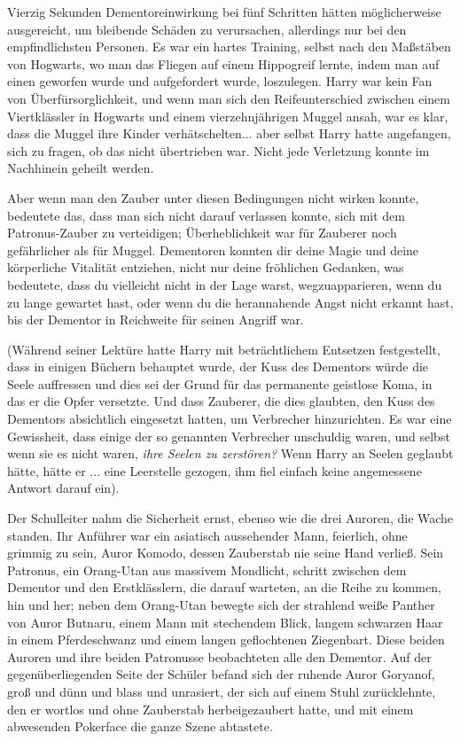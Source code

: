 Vierzig Sekunden Dementoreinwirkung bei fünf Schritten hätten möglicherweise
ausgereicht, um bleibende Schäden zu verursachen, allerdings nur bei den
empfindlichsten Personen. Es war ein hartes Training, selbst nach den Maßstäben
von Hogwarts, wo man das Fliegen auf einem Hippogreif lernte, indem man auf
einen geworfen wurde und aufgefordert wurde, loszulegen. Harry war kein Fan von
Überfürsorglichkeit, und wenn man sich den Reifeunterschied zwischen einem
Viertklässler in Hogwarts und einem vierzehnjährigen Muggel ansah, war es klar,
dass die Muggel ihre Kinder verhätschelten... aber selbst Harry hatte
angefangen, sich zu fragen, ob das nicht übertrieben war. Nicht jede Verletzung
konnte im Nachhinein geheilt werden.

Aber wenn man den Zauber unter diesen Bedingungen nicht wirken konnte, bedeutete
das, dass man sich nicht darauf verlassen konnte, sich mit dem Patronus-Zauber
zu verteidigen; Überheblichkeit war für Zauberer noch gefährlicher als für
Muggel. Dementoren konnten dir deine Magie und deine körperliche Vitalität
entziehen, nicht nur deine fröhlichen Gedanken, was bedeutete, dass du
vielleicht nicht in der Lage warst, wegzuapparieren, wenn du zu lange gewartet
hast, oder wenn du die herannahende Angst nicht erkannt hast, bis der Dementor
in Reichweite für seinen Angriff war.

(Während seiner Lektüre hatte Harry mit beträchtlichem Entsetzen festgestellt,
dass in einigen Büchern behauptet wurde, der Kuss des Dementors würde die Seele
auffressen und dies sei der Grund für das permanente geistlose Koma, in das er
die Opfer versetzte. Und dass Zauberer, die dies glaubten, den Kuss des
Dementors absichtlich eingesetzt hatten, um Verbrecher hinzurichten. Es war eine
Gewissheit, dass einige der so genannten Verbrecher unschuldig waren, und selbst
wenn sie es nicht waren,\emph{ ihre Seelen zu zerstören?} Wenn Harry an Seelen
geglaubt hätte, hätte er ... eine Leerstelle gezogen, ihm fiel einfach keine
angemessene Antwort darauf ein).

Der Schulleiter nahm die Sicherheit ernst, ebenso wie die drei Auroren, die
Wache standen. Ihr Anführer war ein asiatisch aussehender Mann, feierlich, ohne
grimmig zu sein, Auror Komodo, dessen Zauberstab nie seine Hand verließ. Sein
Patronus, ein Orang-Utan aus massivem Mondlicht, schritt zwischen dem Dementor
und den Erstklässlern, die darauf warteten, an die Reihe zu kommen, hin und her;
neben dem Orang-Utan bewegte sich der strahlend weiße Panther von Auror Butnaru,
einem Mann mit stechendem Blick, langem schwarzen Haar in einem Pferdeschwanz
und einem langen geflochtenen Ziegenbart. Diese beiden Auroren und ihre beiden
Patronusse beobachteten alle den Dementor. Auf der gegenüberliegenden Seite der
Schüler befand sich der ruhende Auror Goryanof, groß und dünn und blass und
unrasiert, der sich auf einem Stuhl zurücklehnte, den er wortlos und ohne
Zauberstab herbeigezaubert hatte, und mit einem abwesenden Pokerface die ganze
Szene abtastete.

